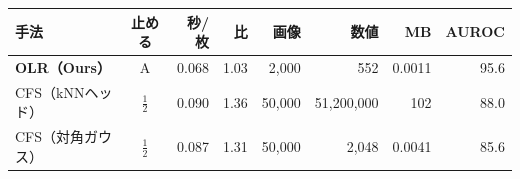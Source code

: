 \documentclass[border=3pt]{standalone}
\begin{document}
%
\begin{tabular}{lcrrrrrr}%
\toprule
手法 & 止める & 秒/枚 & 比 & 画像 & 数値 & MB & AUROC\\
\midrule
\textbf{OLR（Ours）} & A & 0.068 & 1.03 & 2{,}000 & 552 & 0.0011 & 95.6\\
\midrule
CFS（kNNヘッド） & $\frac{1}{2}$ & 0.090 & 1.36 & 50{,}000 & 51{,}200{,}000 & 102 & 88.0\\
CFS（対角ガウス） & $\frac{1}{2}$ & 0.087 & 1.31 & 50{,}000 & 2{,}048 & 0.0041 & 85.6\\
\bottomrule
\end{tabular}%
\end{document}
